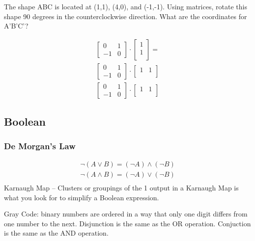 \documentclass{article}
\begin{document}
The shape ABC is located at (1,1), (4,0), and (-1,-1). Using matrices, rotate this shape 90 degrees in the counterclockwise direction. What are the coordinates for A'B'C'?

\begin{equation}
\begin{aligned}
\begin{bmatrix}
   0  &  1 \\
   -1  &   0
\end{bmatrix} \cdot 
\begin{bmatrix}
   1 \\ 1 \\
\end{bmatrix} = \\
\begin{bmatrix}
   0  &  1 \\
   -1  &   0
\end{bmatrix} \cdot 
\begin{bmatrix}
   1  &  1 \\
\end{bmatrix} \\
\begin{bmatrix}
   0  &  1 \\
   -1  &   0
\end{bmatrix} \cdot 
\begin{bmatrix}
   1  &  1 \\
\end{bmatrix} 
\end{aligned}
\end{equation}
\subsection{Boolean}
\subsubsection{De Morgan's Law}
\begin{align*}
\neg(A \lor B) = (\neg A) \land ( \neg B) \\
\neg(A \land B) = (\neg A) \lor ( \neg B) \\
\end{align*}
Karnaugh Map -- Clusters or groupings of the 1 output in a Karnaugh Map is what you look for to simplify a Boolean expression.

Gray Code: binary numbers are ordered in a way that only one digit differs from one number to the next.
Disjunction is the same as the OR operation.
Conjuction is the same as the AND operation.
\end{document}
